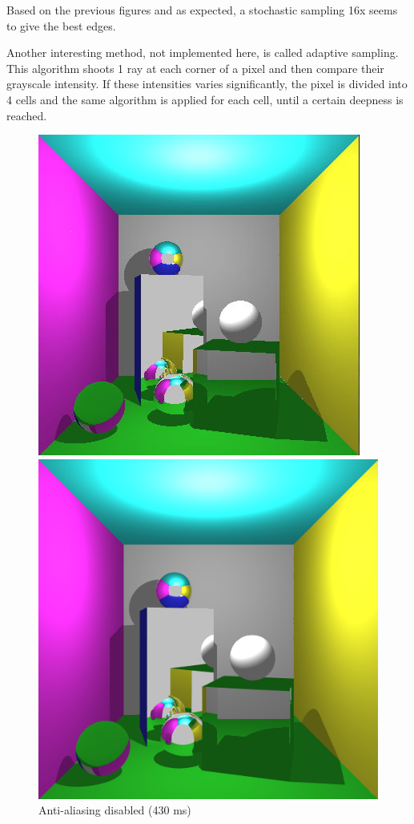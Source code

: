 Based on the previous figures and as expected, a stochastic sampling 16x seems to give the best edges.

Another interesting method, not implemented here, is called adaptive sampling. This algorithm shoots 1 ray at each corner of a pixel and then compare their grayscale intensity. If these intensities varies significantly, the pixel is divided into 4 cells and the same algorithm is applied for each cell, until a certain deepness is reached.

\begin{figure}[H]
\centering
{}
    \centering
    \includegraphics[width=\linewidth]{img/glass_refraction.jpg}
    \caption{Anti-aliasing disabled (430 ms)}
\endminipage
{}
    \centering
    \includegraphics[width=\linewidth]{img/antialiasing/stoAA16x_full.png}

\end{figure}
